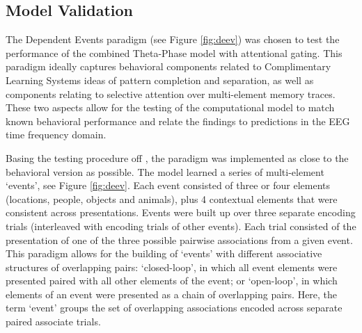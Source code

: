 \documentclass[11pt, titlepage, twoside]{article}
\begin{document}
\subsection{Model Validation}
\label{sec:ModelTest}

The Dependent Events paradigm (see Figure \ref{fig:deev}) was chosen to test the performance of the combined Theta-Phase model with attentional gating.  This paradigm ideally captures behavioral components related to Complimentary Learning Systems ideas of pattern completion and separation, as well as components relating to selective attention over multi-element memory traces.  These two aspects allow for the testing of the computational model to match known behavioral performance and relate the findings to predictions in the EEG time frequency domain.

Basing the testing procedure off \textcite{HornerBisbyBushEtAl15}, the paradigm was implemented as close to the behavioral version as possible.  The model learned a series of multi-element `events', see Figure \ref{fig:deev}. Each event consisted of three or four elements (locations, people, objects and animals), plus 4 contextual elements that were consistent across presentations. Events were built up over three separate encoding trials (interleaved with encoding trials of other events). Each trial consisted of the presentation of one of the three possible pairwise associations from a given event. This paradigm allows for the building of `events' with different associative structures of overlapping pairs: `closed-loop', in which all event elements were presented paired with all other elements of the event; or `open-loop', in which elements of an event were presented as a chain of overlapping pairs. Here, the term `event' groups  the set of overlapping associations encoded across separate paired associate trials. 
\end{document}
